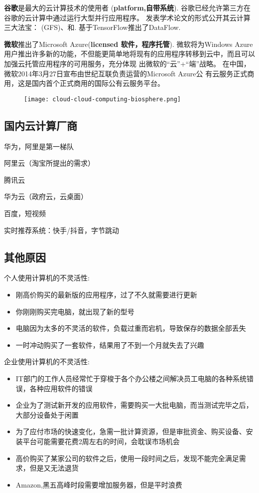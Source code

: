 \textbf{谷歌}是最大的云计算技术的使用者 (\textbf{platform,自带系统}). 谷歌已经允许第三方在谷歌的云计算中通过运行大型并行应用程序。 发表学术论文的形式公开其云计算三大法宝： (GFS)、和. 基于TensorFlow推出了DataFlow.


\textbf{微软}推出了Microsoft Azure(\textbf{licensed 软件，程序托管}). 微软将为Windows Azure用户推出许多新的功能，不但能更简单地将现有的应用程序转移到云中，而且可以加强云托管应用程序的可用服务，充分体现 出微软的“云”+“端”战略。 在中国，微软2014年3月27日宣布由世纪互联负责运营的Microsoft Azure公 有云服务正式商用，这是国内首个正式商用的国际公有云服务平台。 

\begin{figure}[htbp]
    \centering
    \texttt{[image: cloud-cloud-computing-biosphere.png]}
\end{figure}

\subsection{国内云计算厂商}

华为，阿里是第一梯队

阿里云（淘宝所提出的需求） 

腾讯云 

华为云（政府云，云桌面）

百度，短视频

实时推荐系统：快手/抖音，字节跳动

\subsection{其他原因}

个人使用计算机的不灵活性:

\begin{itemize}
    \item 刚高价购买的最新版的应用程序，过了不久就需要进行更新
    \item 你刚刚购买完电脑，就出现了新的型号
    \item 电脑因为太多的不灵活的软件，负载过重而宕机，导致保存的数据全部丢失
    \item 一时冲动购买了一套软件，结果用了不到一个月就失去了兴趣
\end{itemize}

企业使用计算机的不灵活性:

\begin{itemize}
    
    \item IT部门的工作人员经常忙于穿梭于各个办公楼之间解决员工电脑的各种系统错误，各种应用软件的错误
    \item 企业为了测试新开发的应用软件，需要购买一大批电脑，而当测试完毕之后，大部分设备处于闲置
    \item 为了应付市场的快速变化，急需一批计算资源，但是审批资金、购买设备、安装平台可能需要花费2周左右的时间，会耽误市场机会
    \item 高价购买了某家公司的软件之后，使用一段时间之后，发现不能完全满足需求，但是又无法退货
    \item Amazon,黑五高峰时段需要增加服务器，但是平时浪费
\end{itemize}

